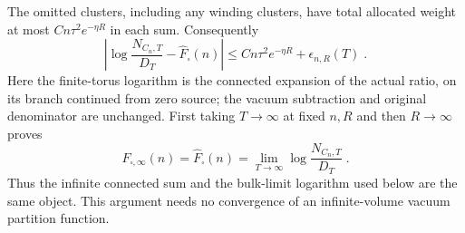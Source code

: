 \documentclass[11pt]{article}
\begin{document}
The omitted clusters, including any winding clusters, have total allocated weight at most $Cn\tau^2e^{-\eta R}$ in each sum. Consequently
\begin{equation}\label{eq:corner-fixed-square-limit-bound}
    \left|\log\frac{N_{C_n,T}}{D_T}
        -\widehat F_\square(n)\right|
        \leq Cn\tau^2e^{-\eta R}+\epsilon_{n,R}(T)\;.
\end{equation}
Here the finite-torus logarithm is the connected expansion of the actual ratio, on its branch continued from zero source; the vacuum subtraction and original denominator are unchanged. First taking $T\to\infty$ at fixed $n,R$ and then $R\to\infty$ proves
\begin{equation}\label{eq:corner-fixed-square-limit}
    F_{\square,\infty}(n)
        =\widehat F_\square(n)
        =\lim_{T\to\infty}\log\frac{N_{C_n,T}}{D_T}\;.
\end{equation}
Thus the infinite connected sum and the bulk-limit logarithm used below are the same object. This argument needs no convergence of an infinite-volume vacuum partition function.
\end{document}

